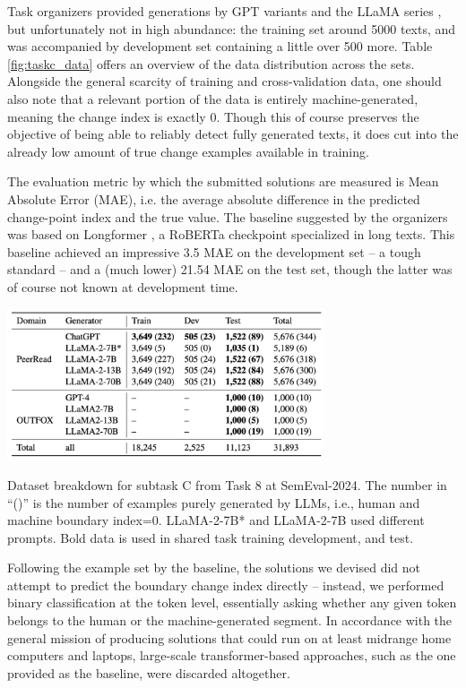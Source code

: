 Task organizers provided generations by GPT variants and the LLaMA series \citep{touvron2023llama}, but unfortunately not in high abundance: the training set around 5000 texts, and was accompanied by development set containing a little over 500 more.
Table \ref{fig:taskc_data} offers an overview of the data distribution across the sets.
Alongside the general scarcity of training and cross-validation data, one should also note that a relevant portion of the data is entirely machine-generated, meaning the change index is exactly 0.
Though this of course preserves the objective of being able to reliably detect fully generated texts, it does cut into the already low amount of true change examples available in training.

The evaluation metric by which the submitted solutions are measured is Mean Absolute Error (MAE), i.e. the average absolute difference in the predicted change-point index and the true value.
The baseline suggested by the organizers was based on Longformer \citep{beltagy2020longformerlongdocumenttransformer}, a RoBERTa checkpoint specialized in long texts.
This baseline achieved an impressive 3.5 MAE on the development set -- a tough standard -- and a (much lower) 21.54 MAE on the test set, though the latter was of course not known at development time.

\vspace{1cm}

\begin{table}[h]
    \centering
    \includegraphics[width=0.7\textwidth]{assets/subtaskc-data.png}
    \caption{
        Dataset breakdown for subtask C from Task 8 at SemEval-2024.
        The number in “()” is the number of examples purely generated by LLMs, i.e., human and machine boundary index=0.
        LLaMA-2-7B* and LLaMA-2-7B used different prompts. Bold data is used in shared task training development, and test.
    }
    \label{fig:taskc_data}
\end{table}

Following the example set by the baseline, the solutions we devised did not attempt to predict the boundary change index directly -- instead, we performed binary classification at the token level, essentially asking whether any given token belongs to the human or the machine-generated segment.
In accordance with the general mission of producing solutions that could run on at least midrange home computers and laptops, large-scale transformer-based approaches, such as the one provided as the baseline, were discarded altogether.


